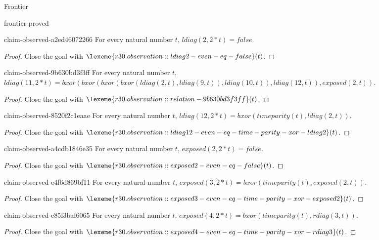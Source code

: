 \begin{lexlean}{Frontier}
\begin{section}{frontier-proved}
\begin{theorem}{claim-observed-a2ed46072266}
For every natural number \(t\), \(ldiag(2, 2 * t) = false\).
\begin{proof}
Close the goal with \(\lexeme{r30.observation::ldiag2-even-eq-false}(t)\).
\end{proof}
\end{theorem}

\begin{theorem}{claim-observed-9b630bd3f3ff}
For every natural number \(t\), \(ldiag(11, 2 * t) = bxor(bxor(bxor(bxor(ldiag(2, t), ldiag(9, t)), ldiag(10, t)), ldiag(12, t)), exposed(2, t))\).
\begin{proof}
Close the goal with \(\lexeme{r30.observation::relation-9b630bd3f3ff}(t)\).
\end{proof}
\end{theorem}

\begin{theorem}{claim-observed-8520f2c1eaae}
For every natural number \(t\), \(ldiag(12, 2 * t) = bxor(timeparity(t), ldiag(2, t))\).
\begin{proof}
Close the goal with \(\lexeme{r30.observation::ldiag12-even-eq-time-parity-xor-ldiag2}(t)\).
\end{proof}
\end{theorem}

\begin{theorem}{claim-observed-a4cdb1846e35}
For every natural number \(t\), \(exposed(2, 2 * t) = false\).
\begin{proof}
Close the goal with \(\lexeme{r30.observation::exposed2-even-eq-false}(t)\).
\end{proof}
\end{theorem}

\begin{theorem}{claim-observed-e4f6d869bf11}
For every natural number \(t\), \(exposed(3, 2 * t) = bxor(timeparity(t), exposed(2, t))\).
\begin{proof}
Close the goal with \(\lexeme{r30.observation::exposed3-even-eq-time-parity-xor-exposed2}(t)\).
\end{proof}
\end{theorem}

\begin{theorem}{claim-observed-c85f3baf6065}
For every natural number \(t\), \(exposed(4, 2 * t) = bxor(timeparity(t), rdiag(3, t))\).
\begin{proof}
Close the goal with \(\lexeme{r30.observation::exposed4-even-eq-time-parity-xor-rdiag3}(t)\).
\end{proof}
\end{theorem}


\end{section}
\end{lexlean}
